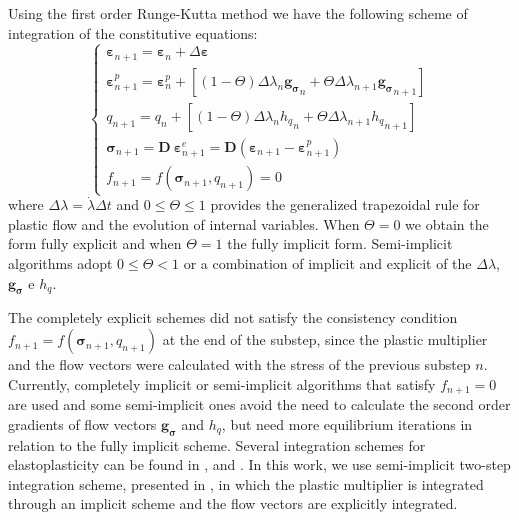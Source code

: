 \documentclass[Journal,letterpaper]{ascelike-new}
\newcommand{\dgds}{\boldsymbol{g_\sigma}}
\newcommand{\Dsdee}{\boldsymbol{D}}
\newcommand{\hl}{{h_q}}
\newcommand{\strain}{\boldsymbol{\varepsilon}}
\newcommand{\stress}{\boldsymbol{\sigma}}
\begin{document}
Using the first order Runge-Kutta method we have the following scheme of integration of the constitutive equations:
\begin{equation}
	\label{eq:esquema_int_constitutiva_ep}
	\left\{
\begin{array}{lcl}
	\strain_{n+1} = \strain_n + \Delta \strain \\
	\strain_{n+1}^p = \strain_n^p + \left[(1-\Theta) \Delta \lambda_n \dgds_n + \Theta \Delta \lambda_{n+1} \dgds_{n+1}\right] \\
	q_{n+1} = q_n + \left[(1-\Theta) \Delta \lambda_n \hl_n + \Theta \Delta \lambda_{n+1} \hl_{n+1}\right] \\	
	\stress_{n+1} = \Dsdee~\strain_{n+1}^e = \Dsdee( \strain_{n+1} - \strain_{n+1}^p) \\
	f_{n+1} = f(\stress_{n+1},q_{n+1}) = 0		
\end{array}
\right.
\end{equation}
where $\Delta \lambda = \dot\lambda\Delta t$ and $0 \leq \Theta \leq 1$ provides the generalized trapezoidal rule for  plastic flow and the evolution of internal variables. When $\Theta = 0$ we obtain the form fully explicit and when $\Theta = 1$ the fully implicit form. Semi-implicit algorithms adopt $0 \leq \Theta < 1$ or a combination of implicit and explicit of the $\Delta \lambda$, $\dgds$ e $\hl$. 

The completely explicit schemes did not satisfy the consistency condition $f_{n+1}=f(\stress_{n+1},q_{n+1})$ at the end of the substep, since the plastic multiplier and the flow vectors were calculated with the stress of the previous substep $n$. Currently, completely implicit or semi-implicit algorithms that satisfy $f_{n+1} = 0$ are used and some semi-implicit ones avoid the need to calculate the second order gradients of flow vectors $\dgds$ and $\hl$, but need more equilibrium iterations in relation to the fully implicit scheme. Several integration schemes for elastoplasticity can be found in ,  and . In this work, we use semi-implicit two-step integration scheme, presented in , in which the plastic multiplier is integrated through an implicit scheme and the flow vectors are explicitly integrated.
\end{document}
